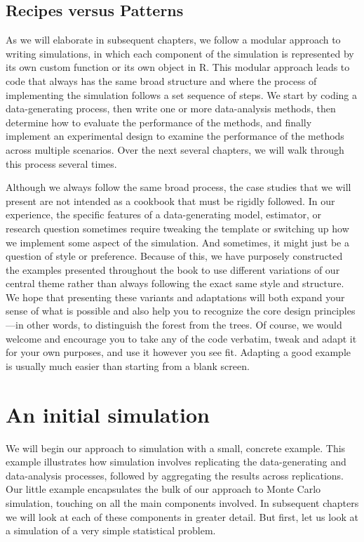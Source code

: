 \documentclass[
]{book}
\begin{document}
\section{Recipes versus Patterns}\label{recipes-versus-patterns}

As we will elaborate in subsequent chapters, we follow a modular approach to writing simulations, in which each component of the simulation is represented by its own custom function or its own object in R.
This modular approach leads to code that always has the same broad structure and where the process of implementing the simulation follows a set sequence of steps.
We start by coding a data-generating process, then write one or more data-analysis methods, then determine how to evaluate the performance of the methods, and finally implement an experimental design to examine the performance of the methods across multiple scenarios.
Over the next several chapters, we will walk through this process several times.

Although we always follow the same broad process, the case studies that we will present are not intended as a cookbook that must be rigidly followed.
In our experience, the specific features of a data-generating model, estimator, or research question sometimes require tweaking the template or switching up how we implement some aspect of the simulation.
And sometimes, it might just be a question of style or preference.
Because of this, we have purposely constructed the examples presented throughout the book to use different variations of our central theme rather than always following the exact same style and structure.
We hope that presenting these variants and adaptations will both expand your sense of what is possible and also help you to recognize the core design principles---in other words, to distinguish the forest from the trees.
Of course, we would welcome and encourage you to take any of the code verbatim, tweak and adapt it for your own purposes, and use it however you see fit.
Adapting a good example is usually much easier than starting from a blank screen.

\chapter{An initial simulation}\label{t-test-simulation}

We will begin our approach to simulation with a small, concrete example.
This example illustrates how simulation involves replicating the data-generating and data-analysis processes, followed by aggregating the results across replications.
Our little example encapsulates the bulk of our approach to Monte Carlo simulation, touching on all the main components involved.
In subsequent chapters we will look at each of these components in greater detail.
But first, let us look at a simulation of a very simple statistical problem.
\end{document}
